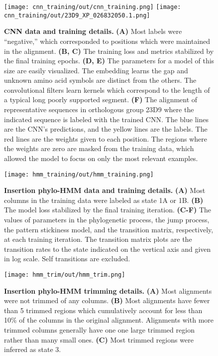 \documentclass[10pt,letterpaper]{article}
\begin{document}
\begin{figure}[h!]
\texttt{[image: cnn\_training/out/cnn\_training.png]}
\texttt{[image: cnn\_training/out/23D9\_XP\_026832050.1.png]}
\centering
\caption{\textbf{CNN data and training details.}
\textbf{(A)} Most labels were “negative,” which corresponded to positions which were maintained in the alignment. \textbf{(B, C)} The training loss and metrics stabilized by the final training epochs. \textbf{(D, E)} The parameters for a model of this size are easily visualized. The embedding learns the gap and unknown amino acid symbols are distinct from the others. The convolutional filters learn kernels which correspond to the length of a typical long poorly supported segment. \textbf{(F)} The alignment of representative sequences in orthologous group 23D9 where the indicated sequence is labeled with the trained CNN. The blue lines are the CNN’s predictions, and the yellow lines are the labels. The red lines are the weights given to each position. The regions where the weights are zero are masked from the training data, which allowed the model to focus on only the most relevant examples.}
\label{sfig:cnn_training}
\end{figure}

\begin{figure}[h!]
\texttt{[image: hmm\_training/out/hmm\_training.png]}
\centering
\caption{\textbf{Insertion phylo-HMM data and training details.}
\textbf{(A)} Most columns in the training data were labeled as state 1A or 1B. \textbf{(B)} The model loss stabilized by the final training iteration. \textbf{(C-F)} The values of parameters in the phylogenetic process, the jump process, the pattern stickiness model, and the transition matrix, respectively, at each training iteration. The transition matrix plots are the transition rates to the state indicated on the vertical axis and given in log scale. Self transitions are excluded.}
\label{sfig:hmm_training}
\end{figure}

\begin{figure}[h!]
\texttt{[image: hmm\_trim/out/hmm\_trim.png]}
\centering
\caption{\textbf{Insertion phylo-HMM trimming details.}
\textbf{(A)} Most alignments were not trimmed of any columns. \textbf{(B)} Most alignments have fewer than 5 trimmed regions which cumulatively account for less than 10\% of the columns in the original alignment. Alignments with more trimmed columns generally have one one large trimmed region rather than many small ones. \textbf{(C)} Most trimmed regions were inferred as state 3.}
\label{sfig:hmm_trim}
\end{figure}
\end{document}
